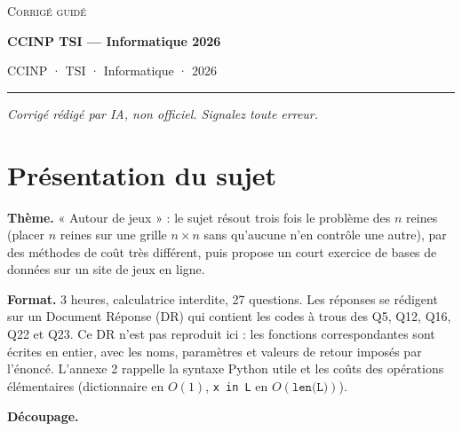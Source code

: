 \documentclass[11pt,a4paper]{article}
\begin{document}
\thispagestyle{plain}
\begin{center}
  {\small\scshape Corrigé guidé}\par\smallskip
  {\LARGE\bfseries CCINP TSI — Informatique 2026\par}\medskip
  {\large CCINP · TSI · Informatique · 2026\par}
\end{center}
\vspace{2pt}\hrule\vspace{8pt}

\emph{Corrigé rédigé par IA, non officiel. Signalez toute erreur.}

\hypertarget{pruxe9sentation-du-sujet}{%
\section{Présentation du sujet}\label{pruxe9sentation-du-sujet}}

\textbf{Thème.} « Autour de jeux » : le sujet résout trois fois le problème des \(n\) reines (placer \(n\) reines sur une grille \(n \times n\) sans qu'aucune n'en contrôle une autre), par des méthodes de coût très différent, puis propose un court exercice de bases de données sur un site de jeux en ligne.

\textbf{Format.} 3 heures, calculatrice interdite, 27 questions. Les réponses se rédigent sur un Document Réponse (DR) qui contient les codes à trous des Q5, Q12, Q16, Q22 et Q23. Ce DR n'est pas reproduit ici : les fonctions correspondantes sont écrites en entier, avec les noms, paramètres et valeurs de retour imposés par l'énoncé. L'annexe 2 rappelle la syntaxe Python utile et les coûts des opérations élémentaires (dictionnaire en \(O(1)\), \texttt{x\ in\ L} en \(O(\texttt{len(L)})\)).

\textbf{Découpage.}
\end{document}
